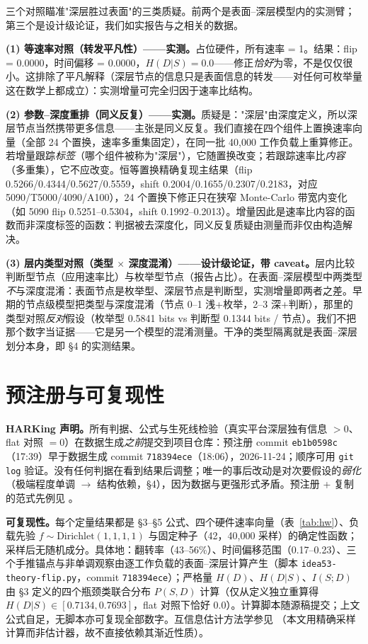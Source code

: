 \documentclass[12pt]{ctexart}
\begin{document}
三个对照瞄准"深层胜过表面"的三类质疑。前两个是表面--深层模型内的实测臂；第三个是设计级论证，我们如实报告与之相关的数据。

\textbf{(1) 等速率对照（转发平凡性）——实测。}占位硬件，所有速率 = 1。结果：flip = 0.0000，时间偏移 = 0.0000，$H(D|S) = 0.0$——修正\emph{恰好}为零，不是仅仅很小。这排除了平凡解释（深层节点的信息只是表面信息的转发——对任何可枚举量这在数学上都成立）：实测增量可完全归因于速率比结构。

\textbf{(2) 参数--深度重排（同义反复）——实测。}质疑是："深层"由深度定义，所以深层节点当然携带更多信息——主张是同义反复。我们直接在四个组件上置换速率向量（全部 24 个置换，速率多重集固定），在同一批 40{,}000 工作负载上重算修正。若增量跟踪\emph{标签}（哪个组件被称为"深层"），它随置换改变；若跟踪速率比\emph{内容}（多重集），它不应改变。恒等置换精确复现主结果（flip 0.5266/0.4344/0.5627/0.5559，shift 0.2004/0.1655/0.2307/0.2183，对应 5090/T5000/4090/A100），24 个置换下修正只在狭窄 Monte-Carlo 带宽内变化（如 5090 flip 0.5251--0.5304，shift 0.1992--0.2013）。增量因此是速率比内容的函数而非深度标签的函数：判据被去深度化，同义反复质疑由测量而非仅由构造解决。

\textbf{(3) 层内类型对照（类型 $\times$ 深度混淆）——设计级论证，带 caveat。}层内比较判断型节点（应用速率比）与枚举型节点（报告占比）。在表面--深层模型中两类型\emph{不}与深度混淆：表面节点是枚举型、深层节点是判断型，实测增量即两者之差。早期的节点级模型把类型与深度混淆（节点 0--1 浅+枚举，2--3 深+判断），那里的类型对照\emph{反对}假设（枚举型 0.5841 bits vs 判断型 0.1344 bits / 节点）。我们不把那个数字当证据——它是另一个模型的混淆测量。干净的类型隔离就是表面--深层划分本身，即 §4 的实测结果。

\section{预注册与可复现性}\label{prereg}

\textbf{HARKing 声明。}所有判据、公式与生死线检验（真实平台深层独有信息 $>0$、flat 对照 $=0$）在数据生成\emph{之前}提交到项目仓库：预注册 commit \texttt{eb1b0598c}（17:39）早于数据生成 commit \texttt{718394ece}（18:06），2026-11-24；顺序可用 \texttt{git log} 验证。没有任何判据在看到结果后调整；唯一的事后改动是对次要假设的\emph{弱化}（极端程度单调 $\to$ 结构依赖，§4），因为数据与更强形式矛盾。预注册 + 复制的范式先例见 \cite{camerer2018}。

\textbf{可复现性。}每个定量结果都是 §3--§5 公式、四个硬件速率向量（表~\ref{tab:hw}）、负载先验 $f \sim \text{Dirichlet}(1,1,1,1)$ 与固定种子（42，40{,}000 采样）的确定性函数；采样后无随机成分。具体地：翻转率（43--56\%）、时间偏移范围（0.17--0.23）、三个手推锚点与非单调观察由逐工作负载的表面--深层计算产生（脚本 \texttt{idea53-theory-flip.py}，commit \texttt{718394ece}）；严格量 $H(D)$、$H(D|S)$、$I(S;D)$ 由 §3 定义的四个瓶颈类联合分布 $P(S,D)$ 计算（仅从定义独立重算得 $H(D|S) \in [0.7134, 0.7693]$，flat 对照下恰好 0.0）。计算脚本随源稿提交；上文公式自足，无脚本亦可复现全部数字。互信息估计方法学参见 \cite{kraskov2004}（本文用精确采样计算而非估计器，故不直接依赖其渐近性质）。
\end{document}
